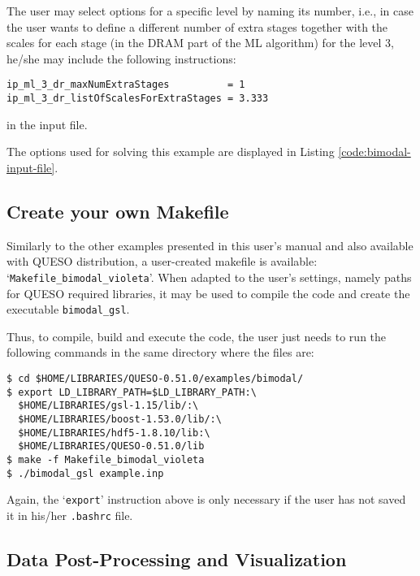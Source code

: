 The user may select options for a specific level by naming its number, i.e., in case the user wants to define a different number of extra stages together with the scales for each stage (in the DRAM part of the ML algorithm) for the level 3, he/she may include the following instructions:
\begin{lstlisting}
ip_ml_3_dr_maxNumExtraStages          = 1
ip_ml_3_dr_listOfScalesForExtraStages = 3.333
\end{lstlisting}
in the input file.


The options used for solving this example are displayed in Listing \ref{code:bimodal-input-file}. 





\subsection{Create your own Makefile}\label{sec:bimodal-makefile}

Similarly to the other examples presented in this user's manual and also available with QUESO distribution, a user-created makefile is available: `\texttt{Makefile\_bimodal\_violeta}'. When adapted to the user's settings, namely paths for  QUESO required libraries, it may be used to compile the code and create the executable \verb+bimodal_gsl+. 

Thus, to compile, build and execute the code, the user just needs to run the following commands in the same directory where the files are:
\begin{lstlisting}
$ cd $HOME/LIBRARIES/QUESO-0.51.0/examples/bimodal/
$ export LD_LIBRARY_PATH=$LD_LIBRARY_PATH:\
  $HOME/LIBRARIES/gsl-1.15/lib/:\
  $HOME/LIBRARIES/boost-1.53.0/lib/:\
  $HOME/LIBRARIES/hdf5-1.8.10/lib:\
  $HOME/LIBRARIES/QUESO-0.51.0/lib 
$ make -f Makefile_bimodal_violeta 
$ ./bimodal_gsl example.inp
\end{lstlisting}

Again, the `\verb+export+' instruction above is only necessary if the user has not saved it in his/her \verb+.bashrc+ file. 


\subsection{Data Post-Processing and Visualization}\label{sec:bimodal-results}




